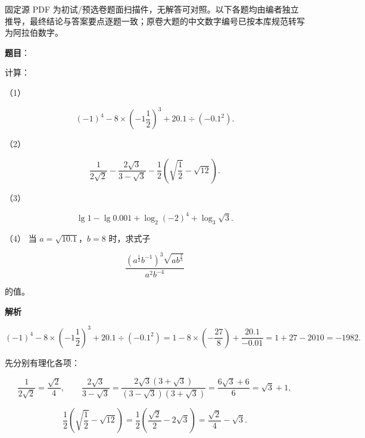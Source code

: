 

\begin{gktip}
固定源 PDF 为初试/预选卷题面扫描件，无解答可对照。以下各题均由编者独立推导，最终结论与答案要点逐题一致；原卷大题的中文数字编号已按本库规范转写为阿拉伯数字。
\end{gktip}

\begin{answer}

\textbf{题目}：

计算：

（1） 

\nopagebreak[4]
\[
(-1)^4-8\times\left(-1\frac12\right)^3+20.1\div(-0.1^2).
\]

（2） 

\nopagebreak[4]
\[
\frac1{2\sqrt2}-\frac{2\sqrt3}{3-\sqrt3}-\frac12\left(\sqrt{\frac12}-\sqrt{12}\right).
\]

（3） 

\nopagebreak[4]
\[
\lg1-\lg0.001+\log_2(-2)^4+\log_3\sqrt3.
\]

（4） 当 $a=\sqrt{10.1}$，$b=8$ 时，求式子

\nopagebreak[4]
\[
\frac{\left(a^{\frac12}b^{-1}\right)^3\sqrt{ab^{\frac23}}}{a^2b^{-4}}
\]

的值。

\textbf{解析}


\nopagebreak[4]
\[
(-1)^4-8\times\left(-1\frac12\right)^3+20.1\div(-0.1^2)
=1-8\times\left(-\frac{27}{8}\right)+\frac{20.1}{-0.01}
=1+27-2010=-1982.
\]


先分别有理化各项：

\nopagebreak[4]
\[
\frac1{2\sqrt2}=\frac{\sqrt2}{4},\qquad
\frac{2\sqrt3}{3-\sqrt3}=\frac{2\sqrt3(3+\sqrt3)}{(3-\sqrt3)(3+\sqrt3)}
=\frac{6\sqrt3+6}{6}=\sqrt3+1,
\]

\nopagebreak[4]
\[
\frac12\left(\sqrt{\frac12}-\sqrt{12}\right)
=\frac12\left(\frac{\sqrt2}{2}-2\sqrt3\right)
=\frac{\sqrt2}{4}-\sqrt3.
\]


\end{answer}
